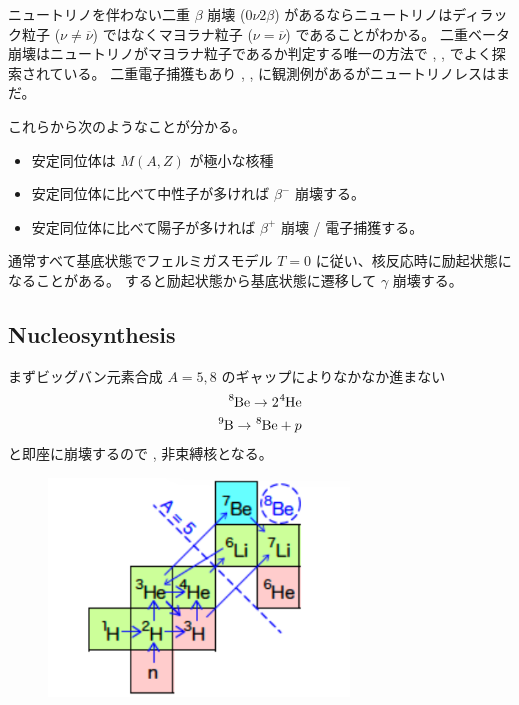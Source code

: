 \documentclass[uplatex,dvipdfmx,a4paper,11pt]{jlreq}
\numberwithin{equation}{section}
\theoremstyle{definition}
\begin{document}
ニュートリノを伴わない二重 $\beta$ 崩壊 ($0\nu2\beta$) があるならニュートリノはディラック粒子 ($\nu \neq \overline{\nu}$) ではなくマヨラナ粒子 ($\nu = \overline{\nu}$) であることがわかる。
⼆重ベータ崩壊はニュートリノがマヨラナ粒子であるか判定する唯⼀の⽅法で , ,  でよく探索されている。
二重電子捕獲もあり , ,  に観測例があるがニュートリノレスはまだ。

これらから次のようなことが分かる。
\begin{itemize}
  \item 安定同位体は $M(A, Z)$ が極小な核種
  \item 安定同位体に比べて中性子が多ければ $\beta^-$ 崩壊する。
  \item 安定同位体に比べて陽子が多ければ $\beta^+$ 崩壊 / 電子捕獲する。
\end{itemize}
通常すべて基底状態でフェルミガスモデル $T = 0$ に従い、核反応時に励起状態になることがある。
すると励起状態から基底状態に遷移して $\gamma$ 崩壊する。

\subsection{Nucleosynthesis}
まずビッグバン元素合成
$A = 5, 8$ のギャップによりなかなか進まない
\begin{align}
  \ce{^8Be} \to 2\ce{^4He} \\
  \ce{^9B} \to \ce{^8Be} + p
\end{align}
と即座に崩壊するので ,  ⾮束縛核となる。
\begin{figure}[htbp]
  \begin{center}
    \includegraphics[width=8cm]{./assets/nuclear.png}
    \caption{}
    \label{fig:2level}
  \end{center}
\end{figure}
\end{document}
